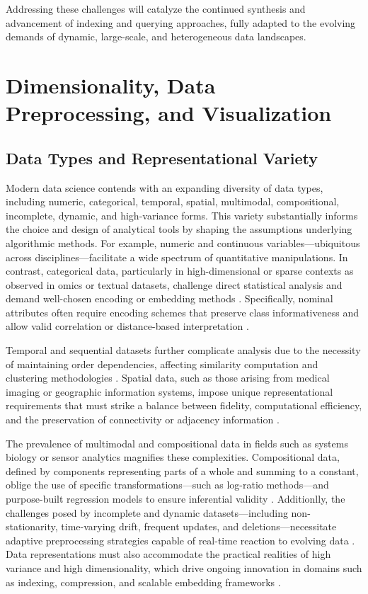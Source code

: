 Addressing these challenges will catalyze the continued synthesis and advancement of indexing and querying approaches, fully adapted to the evolving demands of dynamic, large-scale, and heterogeneous data landscapes.

\section{Dimensionality, Data Preprocessing, and Visualization}

\subsection{Data Types and Representational Variety}

Modern data science contends with an expanding diversity of data types, including numeric, categorical, temporal, spatial, multimodal, compositional, incomplete, dynamic, and high-variance forms. This variety substantially informs the choice and design of analytical tools by shaping the assumptions underlying algorithmic methods. For example, numeric and continuous variables—ubiquitous across disciplines—facilitate a wide spectrum of quantitative manipulations. In contrast, categorical data, particularly in high-dimensional or sparse contexts as observed in omics or textual datasets, challenge direct statistical analysis and demand well-chosen encoding or embedding methods \cite{ref61,ref62,ref63}. Specifically, nominal attributes often require encoding schemes that preserve class informativeness and allow valid correlation or distance-based interpretation \cite{ref61}.

Temporal and sequential datasets further complicate analysis due to the necessity of maintaining order dependencies, affecting similarity computation and clustering methodologies \cite{ref64,ref65}. Spatial data, such as those arising from medical imaging or geographic information systems, impose unique representational requirements that must strike a balance between fidelity, computational efficiency, and the preservation of connectivity or adjacency information \cite{ref67,ref68,ref69,ref70}.

The prevalence of multimodal and compositional data in fields such as systems biology or sensor analytics magnifies these complexities. Compositional data, defined by components representing parts of a whole and summing to a constant, oblige the use of specific transformations—such as log-ratio methods—and purpose-built regression models to ensure inferential validity \cite{ref90,ref92,ref94}. Additionlly, the challenges posed by incomplete and dynamic datasets—including non-stationarity, time-varying drift, frequent updates, and deletions—necessitate adaptive preprocessing strategies capable of real-time reaction to evolving data \cite{ref66,ref70,ref76,ref77,ref78,ref86}. Data representations must also accommodate the practical realities of high variance and high dimensionality, which drive ongoing innovation in domains such as indexing, compression, and scalable embedding frameworks \cite{ref69,ref70,ref78,ref86,ref90}.

